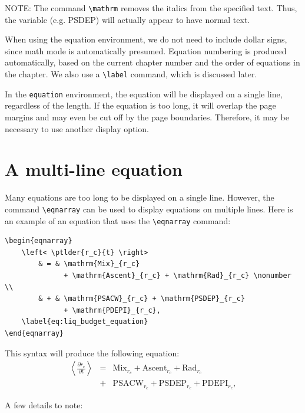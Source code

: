 \documentclass[master]{UWMThesis}
\newcommand{\ptlder}[2]{\frac{\partial #1}{\partial #2}}
\begin{document}
NOTE: The command \verb=\mathrm= removes the italics from the specified text.  Thus, the variable (e.g. PSDEP) will actually appear to have normal text.

When using the equation environment, we do not need to include dollar signs, since math mode is automatically presumed.  Equation numbering is produced automatically, based on the current chapter number and the order of equations in the chapter.  We also use a \verb=\label= command, which is discussed later.

In the \verb=equation= environment, the equation will be displayed on a single line, regardless of the length.  If the equation is too long, it will overlap the page margins and may even be cut off by the page boundaries.  Therefore, it may be necessary to use another display option.


\section{A multi-line equation} \label{sec:multi_line_eq}

Many equations are too long to be displayed on a single line.  However, the command \verb=\eqnarray= can be used to display equations on multiple lines.  Here is an example of an equation that uses the \verb=\eqnarray= command:

\pagebreak

\begin{verbatim}
\begin{eqnarray}
	\left< \ptlder{r_c}{t} \right> 
	    & = & \mathrm{Mix}_{r_c}
	          + \mathrm{Ascent}_{r_c} + \mathrm{Rad}_{r_c} \nonumber \\
	    & + & \mathrm{PSACW}_{r_c} + \mathrm{PSDEP}_{r_c}
	          + \mathrm{PDEPI}_{r_c},
	\label{eq:liq_budget_equation}
\end{eqnarray}
\end{verbatim}

This syntax will produce the following equation:
\begin{eqnarray}
	\left< \ptlder{r_c}{t} \right> & = & \mathrm{Mix}_{r_c} + \mathrm{Ascent}_{r_c} + \mathrm{Rad}_{r_c} \nonumber \\
	                               & + & \mathrm{PSACW}_{r_c} + \mathrm{PSDEP}_{r_c} + \mathrm{PDEPI}_{r_c},
	\label{eq:liq_budget_equation}
\end{eqnarray}

A few details to note:
\end{document}
